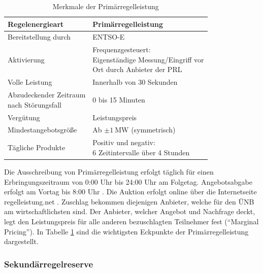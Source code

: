 			\begin{table}[H]
				\renewcommand*{\arraystretch}{1.75}
				\centering
				\caption{Merkmale der Primärregelleistung \cite{Regelleistung_NextKraftwerke}}
				\label{Tab. Merkmale der Primärregellung}
				\begin{tabular}{ll}
					\hline
					Regelenergieart & Primärregelleistung  \\ \hline
					Bereitstellung durch & ENTSO-E  \\
					Aktivierung & \makecell[l]{Frequenzgesteuert: \\ Eigenständige Messung/Eingriff vor \\ Ort durch Anbieter der PRL} \\
					Volle Leistung & Innerhalb von 30 Sekunden \\
					\makecell[l]{Abzudeckender Zeitraum \\ nach Störungsfall} & \num{0} bis \num{15} Minuten  \\
					Vergütung & Leistungspreis  \\
					Mindestangebotsgröße & Ab $\pm\SI{1}{\mega\watt}$ (symmetrisch) \\
					Tägliche Produkte & \makecell[l]{Positiv und negativ: \\ \num{6} Zeitintervalle über \num{4} Stunden} \\ \hline
				\end{tabular}
			\end{table}
			
			Die Ausschreibung von Primärregelleistung erfolgt täglich für einen Erbringungszeitraum von 0:00 Uhr bis 24:00 Uhr am Folgetag.
			Angebotsabgabe erfolgt am Vortag bis 8:00 Uhr  \cite{regelleistungnet_PRL_Ausschreibung}.
			Die Auktion erfolgt online über die Internetseite regelleistung.net \cite{regelleistungnet_PRL_Ausschreibung}.
			Zuschlag bekommen diejenigen Anbieter, welche für den ÜNB am wirtschaftlichsten sind.
			Der Anbieter, welcher Angebot und Nachfrage deckt, legt den Leistungspreis für alle anderen bezuschlagten Teilnehmer fest ("`Marginal Pricing"').
			In Tabelle \ref{Tab. Merkmale der Primärregellung} sind die wichtigsten Eckpunkte der Primärregelleistung dargestellt.		

		\subsubsection{Sekundärregelreserve}		
			
